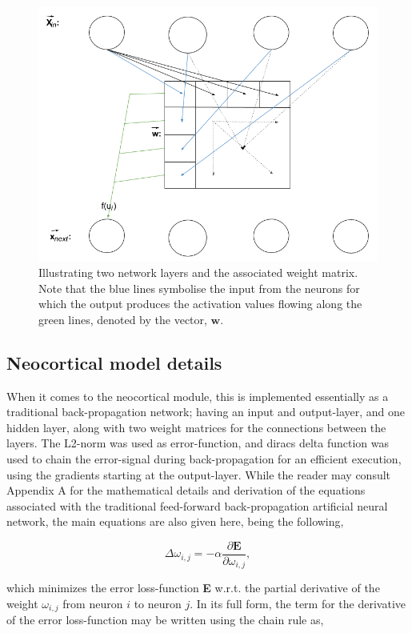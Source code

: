 \begin{figure}
    \centering
    \includegraphics[width=12cm]{fig/network_propagation}
    \caption{Illustrating two network layers and the associated weight matrix. Note that the blue lines symbolise the input from the neurons for which the output produces the activation values flowing along the green lines, denoted by the vector, $\textbf{w}$.}
    \label{fig:network_layout}
\end{figure}


\subsection{Neocortical model details}

When it comes to the neocortical module, this is implemented essentially as a traditional back-propagation network; having an input and output-layer, and one hidden layer, along with two weight matrices for the connections between the layers. The L2-norm was used as error-function, and diracs delta function was used to chain the error-signal during back-propagation for an efficient execution, using the gradients starting at the output-layer. While the reader may consult Appendix A for the mathematical details and derivation of the equations associated with the traditional feed-forward back-propagation artificial neural network, the main equations are also given here, being the following,

\begin{equation}
    \Delta \omega_{i,j} = -\alpha \frac{\partial \textbf{E}}{\partial \omega_{i,j}},
\end{equation}

\noindent
which minimizes the error loss-function \textbf{E} w.r.t. the partial derivative of the weight $\omega_{i,j}$ from neuron $i$ to neuron $j$.
In its full form, the term for the derivative of the error loss-function may be written using the chain rule as,

